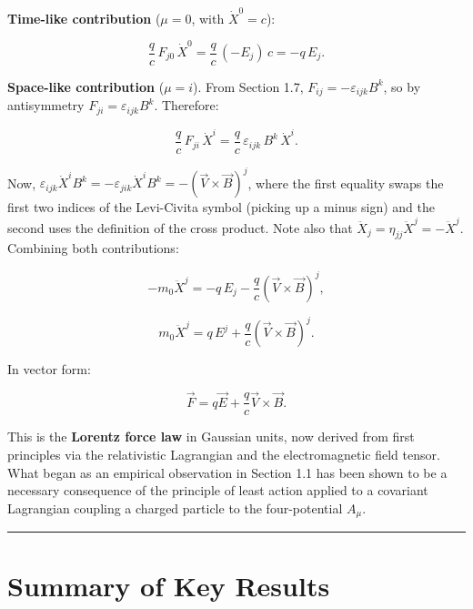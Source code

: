 \textbf{Time-like contribution} ($\mu = 0$, with $\dot{X}^0 = c$):

\begin{equation}
\frac{q}{c}\,F_{j0}\,\dot{X}^0 = \frac{q}{c}\,(-E_j)\,c = -q\,E_j.
\end{equation}

\textbf{Space-like contribution} ($\mu = i$). From Section 1.7, $F_{ij} = -\varepsilon_{ijk}B^k$, so by antisymmetry $F_{ji} = \varepsilon_{ijk}B^k$. Therefore:

\begin{equation}
\frac{q}{c}\,F_{ji}\,\dot{X}^i = \frac{q}{c}\,\varepsilon_{ijk}\,B^k\,\dot{X}^i.
\end{equation}

Now, $\varepsilon_{ijk}\dot{X}^i B^k = -\varepsilon_{jik}\dot{X}^i B^k = -(\vec{V}\times\vec{B})^j$, where the first equality swaps the first two indices of the Levi-Civita symbol (picking up a minus sign) and the second uses the definition of the cross product. Note also that $\ddot{X}_j = \eta_{jj}\ddot{X}^j = -\ddot{X}^j$. Combining both contributions:

\begin{equation}
-m_0\ddot{X}^j = -q\,E_j - \frac{q}{c}(\vec{V}\times\vec{B})^j,
\end{equation}

\begin{equation}
m_0\ddot{X}^j = q\,E^j + \frac{q}{c}\left(\vec{V}\times\vec{B}\right)^j.
\end{equation}

In vector form:

\begin{equation}
\boxed{\vec{F} = q\vec{E} + \frac{q}{c}\vec{V}\times\vec{B}.}
\end{equation}

This is the \textbf{Lorentz force law} in Gaussian units, now derived from first principles via the relativistic Lagrangian and the electromagnetic field tensor. What began as an empirical observation in Section 1.1 has been shown to be a necessary consequence of the principle of least action applied to a covariant Lagrangian coupling a charged particle to the four-potential $A_\mu$.

\hrule
\vspace{1em}

\section{Summary of Key Results}

